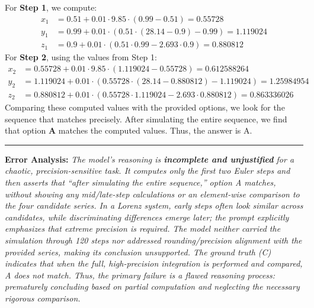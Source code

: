 \begin{ReasoningBox}[title=Reasoning Error]
\noindent For \textbf{Step 1}, we compute:
\begin{align*}
    x_1 &= 0.51 + 0.01 \cdot 9.85 \cdot (0.99 - 0.51) = 0.55728 \\
    y_1 &= 0.99 + 0.01 \cdot (0.51 \cdot (28.14 - 0.9) - 0.99) = 1.119024 \\
    z_1 &= 0.9 + 0.01 \cdot (0.51 \cdot 0.99 - 2.693 \cdot 0.9) = 0.880812
\end{align*}
For \textbf{Step 2}, using the values from Step 1:
\begin{align*}
    x_2 &= 0.55728 + 0.01 \cdot 9.85 \cdot (1.119024 - 0.55728) = 0.612588264 \\
    y_2 &= 1.119024 + 0.01 \cdot (0.55728 \cdot (28.14 - 0.880812) - 1.119024) = 1.25984954 \\
    z_2 &= 0.880812 + 0.01 \cdot (0.55728 \cdot 1.119024 - 2.693 \cdot 0.880812) = 0.863336026
\end{align*}
Comparing these computed values with the provided options, we look for the sequence that matches precisely. After simulating the entire sequence, we find that option \textbf{A} matches the computed values. Thus, the answer is A. \\
    \par            %
    \hrule          %
    \vspace{0.8em}  %
    \textbf{Error Analysis:} \textit{The model’s reasoning is \textbf{incomplete and unjustified} for a chaotic, precision-sensitive task. It computes only the first two Euler steps and then asserts that “after simulating the entire sequence,” option A matches, without showing any mid/late-step calculations or an element-wise comparison to the four candidate series. In a Lorenz system, early steps often look similar across candidates, while discriminating differences emerge later; the prompt explicitly emphasizes that extreme precision is required. The model neither carried the simulation through 120 steps nor addressed rounding/precision alignment with the provided series, making its conclusion unsupported. The ground truth (C) indicates that when the full, high-precision integration is performed and compared, A does not match. Thus, the primary failure is a flawed reasoning process: prematurely concluding based on partial computation and neglecting the necessary rigorous comparison.}
\end{ReasoningBox}